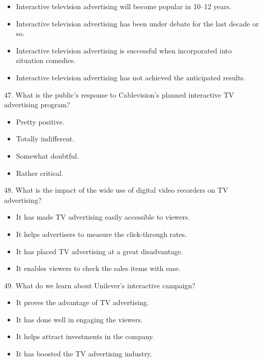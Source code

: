 \documentclass[UTF8,11pt]{ctexart}
\begin{document}
\begin{itemize}[leftmargin=2em,itemsep=.2em,topsep=.4em]\item[A.] Interactive television advertising will become popular in 10–12 years.
\item[B.] Interactive television advertising has been under debate for the last decade or so.
\item[C.] Interactive television advertising is successful when incorporated into situation comedies.
\item[D.] Interactive television advertising has not achieved the anticipated results.
\end{itemize}

47. What is the public’s response to Cablevision’s planned interactive TV advertising program?


\begin{itemize}[leftmargin=2em,itemsep=.2em,topsep=.4em]\item[A.] Pretty positive.
\item[B.] Totally indifferent.
\item[C.] Somewhat doubtful.
\item[D.] Rather critical.
\end{itemize}

48. What is the impact of the wide use of digital video recorders on TV advertising?


\begin{itemize}[leftmargin=2em,itemsep=.2em,topsep=.4em]\item[A.] It has made TV advertising easily accessible to viewers.
\item[B.] It helps advertisers to measure the click-through rates.
\item[C.] It has placed TV advertising at a great disadvantage.
\item[D.] It enables viewers to check the sales items with ease.
\end{itemize}

49. What do we learn about Unilever’s interactive campaign?


\begin{itemize}[leftmargin=2em,itemsep=.2em,topsep=.4em]\item[A.] It proves the advantage of TV advertising.
\item[B.] It has done well in engaging the viewers.
\item[C.] It helps attract investments in the company.
\item[D.] It has boosted the TV advertising industry.
\end{itemize}
\end{document}
